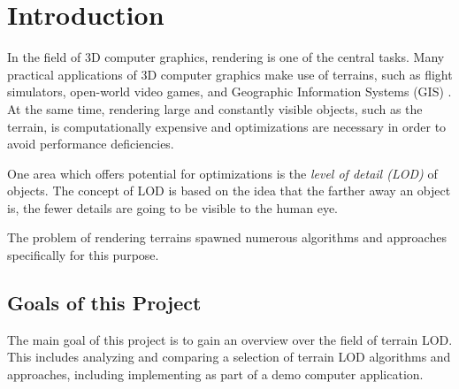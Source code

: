 \chapter{Introduction}
In the field of 3D computer graphics, rendering is one of the central tasks.
Many practical applications of 3D computer graphics make use of terrains, 
such as flight simulators, open-world video games, and Geographic Information Systems (GIS) \cite[p.~185]{lodfor3dgraphics}.
At the same time, rendering large and constantly visible objects, such as the terrain, is computationally expensive 
and optimizations are necessary in order to avoid performance deficiencies.

One area which offers potential for optimizations is the \textit{level of detail (LOD)} of objects.
The concept of LOD is based on the idea that the farther away an object is, the fewer details are going to be visible to the human eye.

The problem of rendering terrains spawned numerous algorithms and approaches specifically
for this purpose. 

\section{Goals of this Project}
The main goal of this project is to gain an overview over the field of 
terrain LOD. This includes analyzing and comparing a selection of terrain LOD algorithms and approaches,
including implementing as part of a demo computer application.


